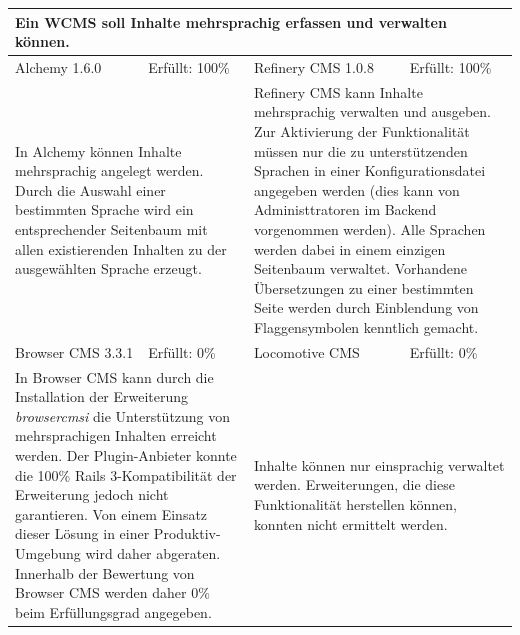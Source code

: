 \begin{tabular}[!ht]{|l|l|l|l|}
\hline
\multicolumn{4}{|p{15cm}|}{\textbf{Ein WCMS soll Inhalte mehrsprachig erfassen und verwalten können.}} \\
\hline
  Alchemy 1.6.0 & \cellcolor{green}Erfüllt: 100\% & Refinery CMS 1.0.8 & \cellcolor{green}Erfüllt: 100\% \\
  \hline
  \multicolumn{2}{|p{7.5cm}|}{In Alchemy können Inhalte mehrsprachig angelegt werden. Durch die Auswahl einer bestimmten Sprache wird ein entsprechender Seitenbaum mit allen existierenden Inhalten zu der ausgewählten Sprache erzeugt.}
   & \multicolumn{2}{p{7.5cm}|}{Refinery CMS kann Inhalte mehrsprachig verwalten und ausgeben. Zur Aktivierung der Funktionalität müssen nur die zu unterstützenden Sprachen in einer Konfigurationsdatei angegeben werden (dies kann von Administtratoren im Backend vorgenommen werden). Alle Sprachen werden dabei in einem einzigen Seitenbaum verwaltet. Vorhandene Übersetzungen zu einer bestimmten Seite werden durch Einblendung von Flaggensymbolen kenntlich gemacht.} \\
  \hline
  Browser CMS 3.3.1 & \cellcolor{red}Erfüllt: 0\% & Locomotive CMS & \cellcolor{red}Erfüllt: 0\% \\
  \hline
  \multicolumn{2}{|p{7.5cm}|}{In Browser CMS kann  durch die Installation der Erweiterung \emph{browsercmsi} die Unterstützung von mehrsprachigen Inhalten erreicht werden. Der Plugin-Anbieter konnte die 100\% Rails 3-Kompatibilität der Erweiterung jedoch nicht garantieren. Von einem Einsatz dieser Lösung in einer Produktiv-Umgebung wird daher abgeraten. Innerhalb der Bewertung von Browser CMS werden daher 0\% beim Erfüllungsgrad angegeben.} & \multicolumn{2}{p{7.5cm}|}{Inhalte können nur einsprachig verwaltet werden. Erweiterungen, die diese Funktionalität herstellen können, konnten nicht ermittelt werden.} \\
\hline
\end{tabular}
\newline
\newline
\newline

